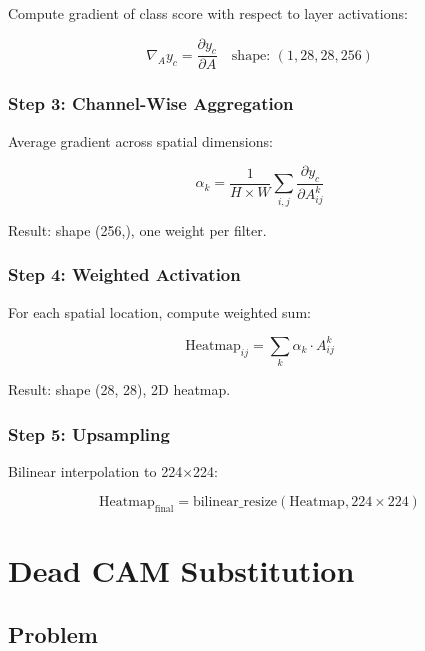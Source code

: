 \documentclass[12pt,a4paper,oneside]{book}
\newcommand{\grad}{\nabla}
\begin{document}
Compute gradient of class score with respect to layer activations:

\begin{equation}
\grad_A y_c = \frac{\partial y_c}{\partial A} \quad \text{shape: } (1, 28, 28, 256)
\end{equation}

\subsubsection{Step 3: Channel-Wise Aggregation}

Average gradient across spatial dimensions:

\begin{equation}
\alpha_k = \frac{1}{H \times W} \sum_{i,j} \frac{\partial y_c}{\partial A_{ij}^k}
\label{eq:channel_weights}
\end{equation}

Result: shape (256,), one weight per filter.

\subsubsection{Step 4: Weighted Activation}

For each spatial location, compute weighted sum:

\begin{equation}
\text{Heatmap}_{ij} = \sum_k \alpha_k \cdot A_{ij}^k
\label{eq:weighted_sum}
\end{equation}

Result: shape (28, 28), 2D heatmap.

\subsubsection{Step 5: Upsampling}

Bilinear interpolation to 224×224:

\begin{equation}
\text{Heatmap}_{\text{final}} = \text{bilinear\_resize}(\text{Heatmap}, 224 \times 224)
\end{equation}

\section{Dead CAM Substitution}

\subsection{Problem}
\end{document}

